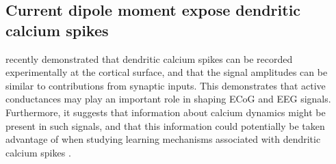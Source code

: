 \documentclass[preprint,10pt,authoryear]{elsarticle}
\begin{document}
\subsection{Current dipole moment expose dendritic calcium spikes}

\cite{SUZUKI2017} recently demonstrated that dendritic calcium spikes can be recorded experimentally at the cortical surface, and that the signal amplitudes can be similar to contributions from synaptic inputs.
This demonstrates that active conductances may play an important role in shaping ECoG and EEG signals. Furthermore, it suggests that information about calcium dynamics might be present in such signals, and that this information could potentially be taken advantage of when studying learning mechanisms associated with dendritic calcium spikes \citep{SUZUKI2017}.
\end{document}
